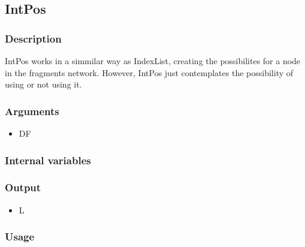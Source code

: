 \subsection{IntPos}\label{IntPos}
\subsubsection{Description}
IntPos works in a simmilar way as IndexList, creating the possibilites for a node in the fragments network. However, IntPos just contemplates the possibility of using or not using it.
\subsubsection{Arguments}
\begin{itemize}
\item DF
\end{itemize}
\subsubsection{Internal variables}
\subsubsection{Output}
\begin{itemize}
\item L
\end{itemize}
\subsubsection{Usage}
